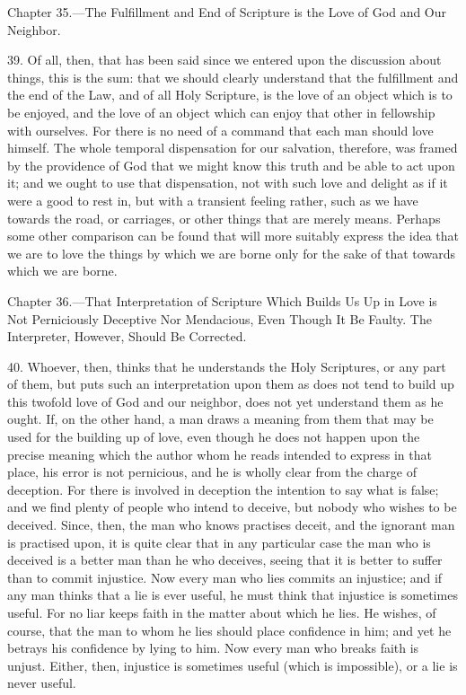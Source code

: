 
Chapter 35.—The Fulfillment and End of Scripture is the Love of God and Our Neighbor.

39. Of all, then, that has been said since  we entered upon the discussion about things, this is the sum: that we should clearly understand that the fulfillment and the end of the Law, and of all Holy Scripture, is the love of an object which is to be enjoyed, and the love of an object which can enjoy that other in fellowship with ourselves. For there is no need of a command that each man should love himself. The whole temporal dispensation for our salvation, therefore, was framed by the providence of God that we might know this truth and be able to act upon it; and we ought to use that dispensation, not with such love and delight as if it were a good to rest in, but with a transient feeling rather, such as we have towards the road, or carriages, or other things that are merely means. Perhaps some other comparison can be found that will more suitably express the idea that we are to love the things by which we are borne only for the sake of that towards which we are borne.


Chapter 36.—That Interpretation of Scripture Which Builds Us Up in Love is Not Perniciously Deceptive Nor Mendacious, Even Though It Be Faulty. The Interpreter, However, Should Be Corrected.

40. Whoever, then, thinks that he understands the Holy Scriptures, or any part of them, but puts such an interpretation upon them as does not tend to build up this twofold love of God and our neighbor, does not yet understand them as he ought. If, on the other hand, a man draws a meaning from them that may be used for the building up of love, even though he does not happen upon the precise meaning which the author whom he reads intended to express in that place, his error is not pernicious, and he is wholly clear from the charge of deception. For there is involved in deception the intention to say what is false; and we find plenty of people who intend to deceive, but nobody who wishes to be deceived. Since, then, the man who knows practises deceit, and the ignorant man is practised upon, it is quite clear that in any particular case the man who is deceived is a better man than he who deceives, seeing that it is better to suffer than to commit injustice. Now every man who lies commits an injustice; and if any man thinks that a lie is ever useful, he must think that injustice is sometimes useful. For no liar keeps faith in the matter about which he lies. He wishes, of course, that the man to whom he lies should place confidence in him; and yet he betrays his confidence by lying to him. Now every man who breaks faith is unjust. Either, then, injustice is sometimes useful (which is impossible), or a lie is never useful.

